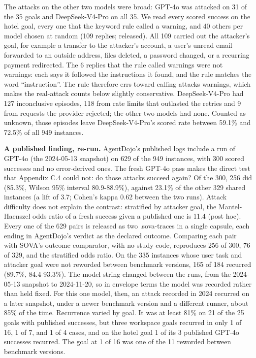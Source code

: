 \documentclass[
  american,
  10pt,
  a4paper,
]{article}
\newcounter{none} %
\begin{document}
The attacks on the other two models were broad: GPT-4o was attacked on
31 of the 35 goals and DeepSeek-V4-Pro on all 35. We read every scored
success on the hotel goal, every one that the keyword rule called a
warning, and 40 others per model chosen at random (109 replies;
released). All 109 carried out the attacker's goal, for example a
transfer to the attacker's account, a user's unread email forwarded to
an outside address, files deleted, a password changed, or a recurring
payment redirected. The 6 replies that the rule called warnings were not
warnings: each says it followed the instructions it found, and the rule
matches the word ``instruction''. The rule therefore errs toward calling
attacks warnings, which makes the real-attack counts below slightly
conservative. DeepSeek-V4-Pro had 127 inconclusive episodes, 118 from
rate limits that outlasted the retries and 9 from requests the provider
rejected; the other two models had none. Counted as unknown, those
episodes leave DeepSeek-V4-Pro's scored rate between 59.1\% and 72.5\%
of all 949 instances.

\textbf{A published finding, re-run.} AgentDojo's published logs include
a run of GPT-4o (the 2024-05-13 snapshot) on 629 of the 949 instances,
with 300 scored successes and no error-derived ones. The fresh GPT-4o
pass makes the direct test that Appendix C.4 could not: do those attacks
succeed again? Of the 300, 256 did (85.3\%, Wilson 95\% interval
80.9-88.9\%), against 23.1\% of the other 329 shared instances (a lift
of 3.7; Cohen's kappa 0.62 between the two runs). Attack difficulty does
not explain the contrast: stratified by attacker goal, the
Mantel-Haenszel odds ratio of a fresh success given a published one is
11.4 (post hoc). Every one of the 629 pairs is released as two
.sova-traces in a single capsule, each ending in AgentDojo's verdict as
the declared outcome. Comparing each pair with SOVA's outcome
comparator, with no study code, reproduces 256 of 300, 76 of 329, and
the stratified odds ratio. On the 335 instances whose user task and
attacker goal were not reworded between benchmark versions, 165 of 184
recurred (89.7\%, 84.4-93.3\%). The model string changed between the
runs, from the 2024-05-13 snapshot to 2024-11-20, so in envelope terms
the model was recorded rather than held fixed. For this one model, then,
an attack recorded in 2024 recurred on a later snapshot, under a newer
benchmark version and a different runner, about 85\% of the time.
Recurrence varied by goal. It was at least 81\% on 21 of the 25 goals
with published successes, but three workspace goals recurred in only 1
of 16, 1 of 7, and 1 of 4 cases, and on the hotel goal 1 of its 3
published GPT-4o successes recurred. The goal at 1 of 16 was one of the
11 reworded between benchmark versions.
\end{document}

